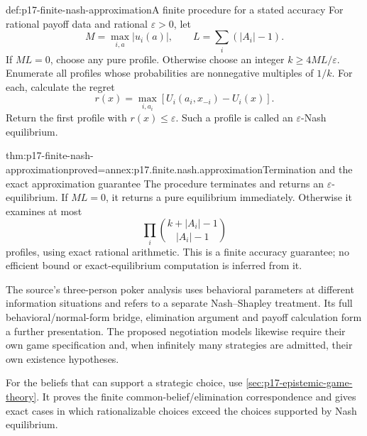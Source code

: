 \begin{hbdefinition}{def:p17-finite-nash-approximation}{A finite procedure for a stated accuracy}
For rational payoff data and rational \(\varepsilon>0\), let
\[
 M=\max_{i,a}|u_i(a)|,\qquad L=\sum_i(|A_i|-1).
\]
If \(ML=0\), choose any pure profile. Otherwise choose an integer
\(k\geq4ML/\varepsilon\). Enumerate all profiles whose
probabilities are nonnegative multiples of \(1/k\).
For each, calculate the regret
\[
                    r(x)=\max_{i,a_i}[U_i(a_i,x_{-i})-U_i(x)].
\]
Return the first profile with \(r(x)\leq\varepsilon\).
Such a profile is called an \(\varepsilon\)-Nash equilibrium.
\end{hbdefinition}

\begin{hbtheorem}{thm:p17-finite-nash-approximation}{proved=annex:p17.finite.nash.approximation}{Termination and the exact approximation guarantee}
The procedure terminates and returns an \(\varepsilon\)-equilibrium.
If \(ML=0\), it returns a pure equilibrium immediately.
Otherwise it examines at most
\[
                         \prod_i {k+|A_i|-1\choose |A_i|-1}
\]
profiles, using exact rational arithmetic. This is a finite
accuracy guarantee; no efficient bound or exact-equilibrium
computation is inferred from it.
\end{hbtheorem}

The source's three-person poker analysis uses behavioral parameters
at different information situations and refers to a separate
Nash--Shapley treatment. Its full behavioral/normal-form bridge,
elimination argument and payoff calculation form a further
presentation. The proposed negotiation models likewise require
their own game specification and, when infinitely many strategies
are admitted, their own existence hypotheses.

For the beliefs that can support a strategic choice, use
\cref{sec:p17-epistemic-game-theory}. It proves the finite
common-belief/elimination correspondence and gives exact cases
in which rationalizable choices exceed the choices supported
by Nash equilibrium.
